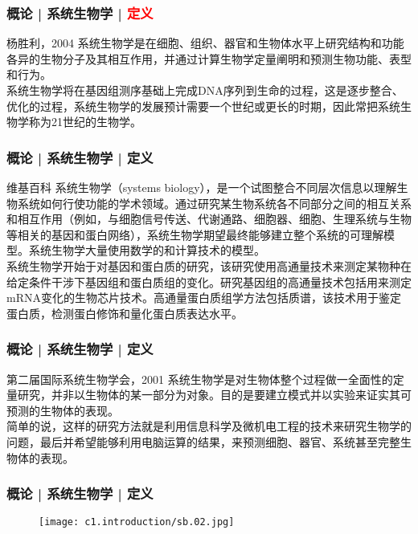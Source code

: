 \begin{frame}
  \frametitle{概论 | 系统生物学 | \textcolor{red}{定义}}
  \begin{block}{杨胜利，2004}
系统生物学是在细胞、组织、器官和生物体水平上研究结构和功能各异的生物分子及其相互作用，并通过计算生物学定量阐明和预测生物功能、表型和行为。\\
\vspace{1em}
系统生物学将在基因组测序基础上完成DNA序列到生命的过程，这是逐步整合、优化的过程，系统生物学的发展预计需要一个世纪或更长的时期，因此常把系统生物学称为21世纪的生物学。
  \end{block}
\end{frame}

\begin{frame}
  \frametitle{概论 | 系统生物学 | 定义}
  \begin{block}{维基百科}
系统生物学（systems biology），是一个试图整合不同层次信息以理解生物系统如何行使功能的学术领域。通过研究某生物系统各不同部分之间的相互关系和相互作用（例如，与细胞信号传送、代谢通路、细胞器、细胞、生理系统与生物等相关的基因和蛋白网络），系统生物学期望最终能够建立整个系统的可理解模型。系统生物学大量使用数学的和计算技术的模型。\\
\vspace{1em}
系统生物学开始于对基因和蛋白质的研究，该研究使用高通量技术来测定某物种在给定条件干涉下基因组和蛋白质组的变化。研究基因组的高通量技术包括用来测定mRNA变化的生物芯片技术。高通量蛋白质组学方法包括质谱，该技术用于鉴定蛋白质，检测蛋白修饰和量化蛋白质表达水平。
  \end{block}
\end{frame}

\begin{frame}
  \frametitle{概论 | 系统生物学 | 定义}
  \begin{block}{第二届国际系统生物学会，2001}
系统生物学是对生物体整个过程做一全面性的定量研究，并非以生物体的某一部分为对象。目的是要建立模式并以实验来证实其可预测的生物体的表现。\\
\vspace{1em}
简单的说，这样的研究方法就是利用信息科学及微机电工程的技术来研究生物学的问题，最后并希望能够利用电脑运算的结果，来预测细胞、器官、系统甚至完整生物体的表现。
  \end{block}
\end{frame}

\begin{frame}
  \frametitle{概论 | 系统生物学 | 定义}
  \begin{figure}
    \centering
    \texttt{[image: c1.introduction/sb.02.jpg]}
  \end{figure}
\end{frame}

